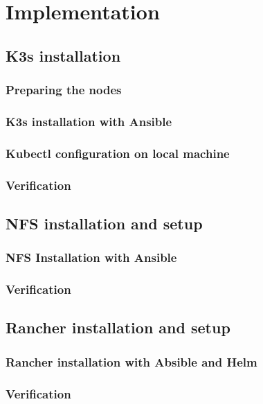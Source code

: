 
\chapter{Implementation} %
\label{Chapter3}

\section{K3s installation}
\subsection{Preparing the nodes}
\subsection{K3s installation with Ansible}
\subsection{Kubectl configuration on local machine}
\subsection{Verification}

\section{NFS installation and setup}
\subsection{NFS Installation with Ansible}
\subsection{Verification}

\section{Rancher installation and setup}
\subsection{Rancher installation with Absible and Helm}
\subsection{Verification}

